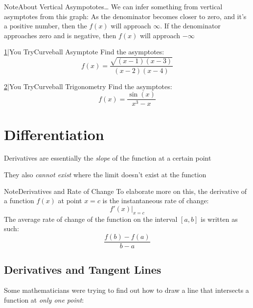 \documentclass{MathNotes}
\newenvironment{note}[1]{\begin{YellowBox}{Note}{#1}}{\end{YellowBox}}
\newenvironment{practice}[2]{\begin{PurpleBox}{\texorpdfstring{#1}\Big|You Try}{#2}}{\end{PurpleBox}}
\begin{document}
\begin{note}{About Vertical Asympototes\ldots}\label{note:vertical-asymptote}
	We can infer something from vertical asymptotes from this graph:
	As the denominator becomes closer to zero, and it's a positive number, then
	the $f(x)$ will approach $\infty$. If the denominator approaches zero and
	is negative, then $f(x)$ will approach $-\infty$
\end{note}

\begin{multicols}{2}
	\begin{practice}{\hyperref[ans:curveball-asymptote]{1}}{Curveball Asymptote}\label{prac:curveball-asymptote}
		Find the asymptotes:
		\begin{displaymath}
			f(x)=\frac{\sqrt{(x-1)(x-3)}}{(x-2)(x-4)}
		\end{displaymath}
	\end{practice}

	\begin{practice}{\hyperref[ans:curveball-trig]{2}}{Curveball Trigonometry}\label{prac:curveball-trig}
		Find the asymptotes:
		\begin{displaymath}
			f(x)=\frac{\sin(x)}{x^3-x}
		\end{displaymath}
	\end{practice}
\end{multicols}

\newpage
\section{Differentiation}\label{sec:differentiation}
Derivatives are essentially the \textit{slope} of the function at a
certain point

They also \textit{cannot exist} where the limit doesn't exist at the
function

\begin{note}{Derivatives and Rate of Change}\label{note:derivatives-rate-of-change}
	To elaborate more on this, the derivative of a function $f(x)$ at point $x=c$
    is the instantaneous rate of change: \[f'(x)\Big|_{x=c}\] The average rate of
	change of the function on the interval $[a, b]$ is written as such:
    \[\frac{f(b)-f(a)}{b-a}\]
\end{note}

\subsection{Derivatives and Tangent Lines}\label{sec:tangent-lines}
\begin{multicols}{2}
	Some mathematicians were trying to find out how to draw a line that intersects
	a function at \textit{only one point}:
	\begin{center}
		
	\end{center}
\end{multicols}
\end{document}
